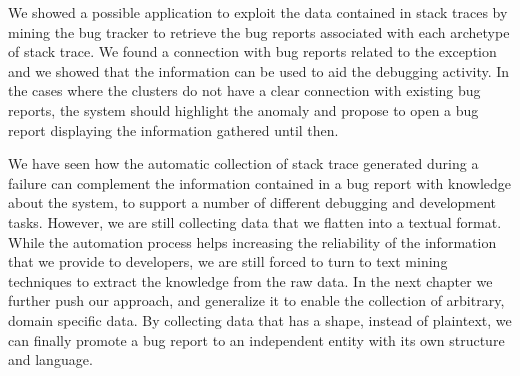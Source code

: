 We showed a possible application to exploit the data contained in stack traces by mining the \pha bug tracker to retrieve the bug reports associated with each archetype of stack trace.
We found a connection with bug reports related to the exception and we showed that the information can be used to aid the debugging activity.
In the cases where the clusters do not have a clear connection with existing bug reports, the system should highlight the anomaly and propose to open a bug report displaying the information gathered until then.


We have seen how the automatic collection of stack trace generated during a failure can complement the information contained in a bug report with knowledge about the system, to support a number of different debugging and development tasks.
However, we are still collecting data that we flatten into a textual format.
While the automation process helps increasing the reliability of the information that we provide to developers, we are still forced to turn to text mining techniques to extract the knowledge from the raw data.
In the next chapter we further push our approach, and generalize it to enable the collection of arbitrary, domain specific data.
By collecting data that has a shape, instead of plaintext, we can finally promote a bug report to an independent entity with its own structure and language.

